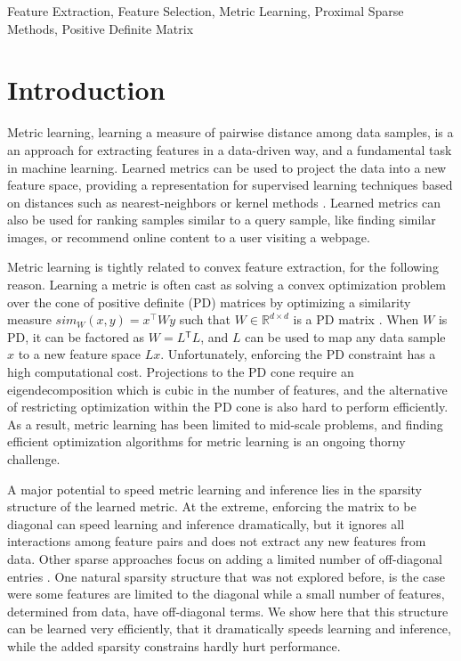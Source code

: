 \documentclass[twoside,11pt]{article}
\newcommand\mat[1]{{#1}}
\newcommand{\T}{{}^\mathsf{T}}
\newcommand{\W}{\mat{W}}
\newcommand{\R}{\mathbb{R}}
\newcommand{\cholL}{\mat{L}}
\begin{document}
\begin{keywords}
  Feature Extraction, Feature Selection, Metric Learning, Proximal Sparse Methods, Positive Definite Matrix 
\end{keywords}

\section{Introduction}
Metric learning, learning a measure of pairwise distance among data samples, is a an approach for extracting features in a data-driven way, and a fundamental task in machine learning. Learned metrics can be used to project the data into a new feature space, providing a representation for supervised learning techniques based on distances such as nearest-neighbors or kernel methods \citep{kulis2012survey}.
Learned metrics can also be used for ranking samples similar to a query sample, like finding similar images, or recommend online content to a user visiting a webpage. 

Metric learning is tightly related to convex feature extraction, for the following reason. Learning a metric is often cast as solving a convex optimization problem over the cone of positive definite (PD) matrices by optimizing a similarity measure $sim_W (x,y) = x^\top W y$ such that $W \in \R^{d \times d}$ is a PD matrix  \citep{kulis2012survey,bellet2013survey}. 
When $\W$ is PD, it can be factored as $\W= \cholL\T \cholL$, and $\cholL$ can be used to map any data sample $x$ to a new feature space $\cholL x$. Unfortunately, enforcing the PD constraint has a high computational cost. Projections to the PD cone require an eigendecomposition which is cubic in the number of features, and the alternative of restricting optimization within the PD cone is also hard to perform efficiently. As a result, metric learning has been limited to mid-scale problems, and finding efficient optimization algorithms for metric learning is an ongoing thorny challenge. 


A major potential to speed metric learning and inference lies in the sparsity structure of the learned metric. At the extreme, enforcing the matrix to be diagonal can speed learning and inference dramatically, but it ignores all interactions among feature pairs and does not extract any new features from  data. Other sparse approaches focus on adding a limited number of off-diagonal entries \citep{HDSL}. One natural sparsity structure that was not explored before, is the case were some features are limited to the diagonal while a small number of features, determined from data, have off-diagonal terms. We show here that this structure can be learned very efficiently, that it dramatically speeds learning and inference, while the added sparsity constrains hardly hurt performance. 
\end{document}
